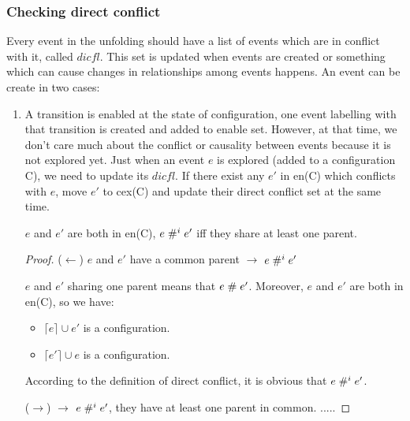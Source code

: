 \documentclass{llncs}
\begin{document}
\subsubsection{Checking direct conflict}
Every event in the unfolding should have a list of events which are in conflict with it, called $dicfl$. This set is updated when events are created or something which can cause changes in relationships among events happens.
An event can be create in two cases:
\begin{enumerate}
	\item
		A transition is enabled at the state of configuration, one event labelling with that transition is
		created and added to enable set. However, at that time, we don't care much about the conflict or
		causality between events because it is not explored yet. Just when an event $e$ is explored (added
		to a configuration C), we need to update its $dicfl$. If there exist any $e'$ in en(C) which
		conflicts with $e$, move $e'$ to cex(C) and update their direct conflict set at the same time. 		
		
		\begin{lemma}
			$e$ and $e'$ are both in en(C), $e \mathrel{\#^i_{}} e'$ iff they share at least one parent.
		\end{lemma}
		
		\begin{proof}
			($\leftarrow$) $e$ and $e'$ have a common parent $\rightarrow$ $e \mathrel{\#^i_{}} e'$
			
			 $e$ and $e'$ sharing one parent means that  $e \mathrel{\#} e'$. Moreover, $e$ and $e'$ are both in
			  en(C), so we have:
			\begin{itemize}
				\item
					$\lceil e \rceil \cup e'$ is a configuration.
				\item
					$\lceil e' \rceil \cup e$ is a configuration.
			\end{itemize} 
			According to the definition of direct conflict, it is obvious that $e \mathrel{\#^i_{}} e'$.
			
			($\rightarrow$) $\rightarrow$ $e \mathrel{\#^i_{}} e'$, they have at least one parent in common.
			.....
			
		\end{proof}			
		

\end{enumerate}
\end{document}
